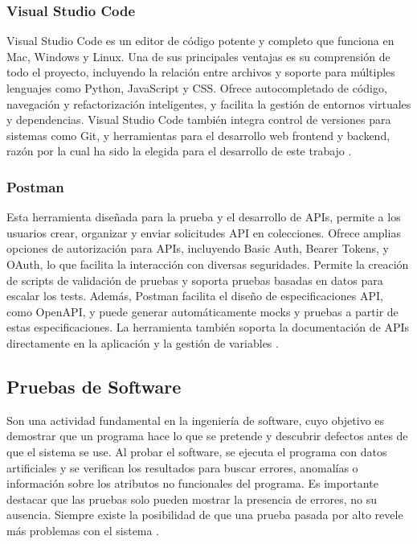 \subsubsection{Visual Studio Code}
Visual Studio Code es un editor de código potente y completo que funciona en Mac, Windows y Linux. Una de sus principales ventajas es su comprensión de todo el proyecto, incluyendo la relación entre archivos y soporte para múltiples lenguajes como Python, JavaScript y CSS. Ofrece autocompletado de código, navegación y refactorización inteligentes, y facilita la gestión de entornos virtuales y dependencias. Visual Studio Code también integra control de versiones para sistemas como Git, y herramientas para el desarrollo web frontend y backend, razón por la cual ha sido la elegida para el desarrollo de este trabajo \cite{kennedy2019effective}.


\subsubsection{Postman}
Esta herramienta diseñada para la prueba y el desarrollo de APIs, permite a los usuarios crear, organizar y enviar solicitudes API en colecciones. Ofrece amplias opciones de autorización para APIs, incluyendo Basic Auth, Bearer Tokens, y OAuth, lo que facilita la interacción con diversas seguridades. Permite la creación de scripts de validación de pruebas y soporta pruebas basadas en datos para escalar los tests. Además, Postman facilita el diseño de especificaciones API, como OpenAPI, y puede generar automáticamente mocks y pruebas a partir de estas especificaciones. La herramienta también soporta la documentación de APIs directamente en la aplicación y la gestión de variables \cite{westerveld2021api}.

\subsection{Pruebas de Software}
Son una actividad fundamental en la ingeniería de software, cuyo objetivo es demostrar que un programa hace lo que se pretende y descubrir defectos antes de que el sistema se use. Al probar el software, se ejecuta el programa con datos artificiales y se verifican los resultados para buscar errores, anomalías o información sobre los atributos no funcionales del programa. Es importante destacar que las pruebas solo pueden mostrar la presencia de errores, no su ausencia. Siempre existe la posibilidad de que una prueba pasada por alto revele más problemas con el sistema \cite{sommerville2011software}.
